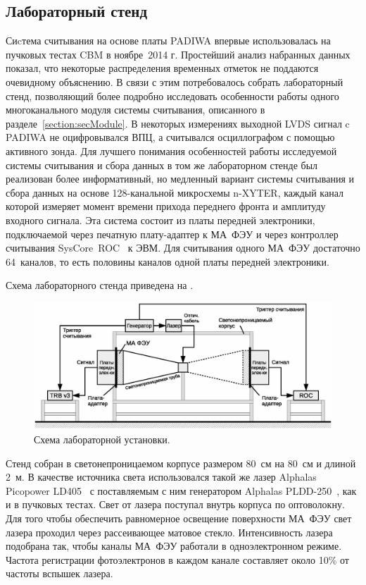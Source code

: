 \subsection{Лабораторный стенд}\label{section:secLabSetup}

Сиcтема считывания на основе платы PADIWA впервые использовалась на пучковых тестах CBM в ноябре~2014 г. Простейший анализ набранных данных показал, что некоторые распределения временных отметок не поддаются очевидному объяснению. В связи с этим потребовалось собрать лабораторный стенд, позволяющий более подробно исследовать особенности работы одного многоканального модуля системы считывания, описанного в разделе~\ref{section:secModule}. В некоторых измерениях выходной LVDS сигнал c PADIWA не оцифровывался ВПЦ, а считывался осциллографом с помощью активного зонда. Для лучшего понимания особенностей работы исследуемой системы считывания и сбора данных в том же лабораторном стенде был реализован более информативный, но медленный вариант системы считывания и сбора данных на основе 128-канальной микросхемы n-XYTER, каждый канал которой измеряет момент времени прихода переднего фронта и амплитуду входного сигнала. Эта система состоит из платы передней электроники, подключаемой через печатную плату-адаптер к МА~ФЭУ и через контроллер считывания SysCore~ROC~\cite{SYSCORE} к ЭВМ. Для считывания одного МА~ФЭУ достаточно 64~каналов, то есть половины каналов одной платы передней электроники.

Схема лабораторного стенда приведена на .

\begin{figure}[H]
\includegraphics[width=1.0\textwidth]{pictures/12_Lab_setup_3_rus.eps}
\caption{Схема лабораторной установки.}
\label{fig:LabSetup}
\end{figure}

Стенд собран в светонепроницаемом корпусе размером 80~см на 80~см и длиной 2~м. В качестве источника света использовался такой же лазер Alphalas Picopower LD405~\cite{ALPHALAS} с поставляемым с ним генератором Alphalas PLDD-250~\cite{ALPHALAS}, как и в пучковых тестах. Свет от лазера поступал внутрь корпуса по оптоволокну.
Для того чтобы обеспечить равномерное освещение поверхности МА~ФЭУ свет лазера проходил через рассеивающее матовое стекло.
Интенсивность лазера подобрана так, чтобы каналы МА~ФЭУ работали в одноэлектронном режиме. Частота регистрации фотоэлектронов в каждом канале составляет около 10\% от частоты вспышек лазера.

